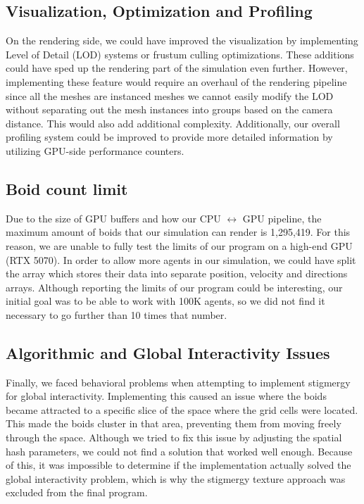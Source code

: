 \documentclass[a4paper, 12pt]{article}
\begin{document}
\subsection{Visualization, Optimization and Profiling}
On the rendering side, we could have improved the visualization by implementing
Level of Detail (LOD) systems or frustum culling optimizations. These additions
could have sped up the rendering part of the simulation even further. However,
implementing these feature would require an overhaul of the rendering pipeline
since all the meshes are instanced meshes we cannot easily modify the LOD
without separating out the mesh instances into groups based on the camera
distance. This would also add additional complexity. Additionally, our overall
profiling system could be improved to provide more detailed information by
utilizing GPU-side performance counters.

\subsection{Boid count limit}
\label{subsec:count_limit}
Due to the size of GPU buffers and how our CPU $\leftrightarrow$ GPU pipeline, the maximum amount of boids that our simulation can render is 1,295,419. For this reason, we are unable to fully test the limits of our program on a high-end GPU (RTX 5070). In order to allow more agents in our simulation, we could have split the array which stores their data into separate position, velocity and directions arrays. Although reporting the limits of our program could be interesting, our initial goal was to be able to work with 100K agents, so we did not find it necessary to go further than 10 times that number.

\subsection{Algorithmic and Global Interactivity Issues}
Finally, we faced behavioral problems when attempting to implement stigmergy
for global interactivity. Implementing this caused an issue where the boids
became attracted to a specific slice of the space where the grid cells were
located. This made the boids cluster in that area,
preventing them from moving freely through the space. Although we tried to fix
this issue by adjusting the spatial hash parameters, we could not find a
solution that worked well enough. Because of this, it was impossible to
determine if the implementation actually solved the global interactivity
problem, which is why the stigmergy texture approach was excluded from the
final program.
\end{document}
